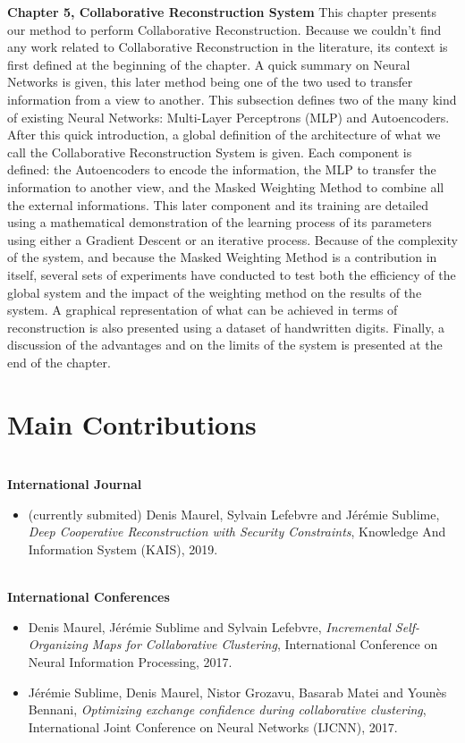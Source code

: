 \textbf{Chapter 5, Collaborative Reconstruction System} This chapter presents our method to perform Collaborative Reconstruction. Because we couldn't find any work related to Collaborative Reconstruction in the literature, its context is first defined at the beginning of the chapter. A quick summary on Neural Networks is given, this later method being one of the two used to transfer information from a view to another. This subsection defines two of the many kind of existing Neural Networks: Multi-Layer Perceptrons (MLP) and Autoencoders. After this quick introduction, a global definition of the architecture of what we call the Collaborative Reconstruction System is given. Each component is defined: the Autoencoders to encode the information, the MLP to transfer the information to another view, and the Masked Weighting Method to combine all the external informations. This later component and its training are detailed using a mathematical demonstration of the learning process of its parameters using either a Gradient Descent or an iterative process. Because of the complexity of the system, and because the Masked Weighting Method is a contribution in itself, several sets of experiments have conducted to test both the efficiency of the global system and the impact of the weighting method on the results of the system. A graphical representation of what can be achieved in terms of reconstruction is also presented using a dataset of handwritten digits. Finally, a discussion of the advantages and on the limits of the system is presented at the end of the chapter.\\


\section{Main Contributions}

\textbf{\\International Journal}

\begin{itemize}
    \item (currently submited) Denis Maurel, Sylvain Lefebvre and J{\'{e}}r{\'{e}}mie Sublime,
        \textit{Deep Cooperative Reconstruction with Security Constraints},
        Knowledge And Information System (KAIS),
        2019.
\end{itemize}

\textbf{\\International Conferences}

\begin{itemize}
    \item Denis Maurel, J{\'e}r{\'e}mie Sublime and Sylvain Lefebvre,
        \textit{Incremental Self-Organizing Maps for Collaborative Clustering},
        International Conference on Neural Information Processing,
        2017.

    \item J{\'e}r{\'e}mie Sublime, Denis Maurel, Nistor Grozavu, Basarab Matei and Younès Bennani,
        \textit{Optimizing exchange confidence during collaborative clustering},
        International Joint Conference on Neural Networks (IJCNN),
        2017.
\end{itemize}

